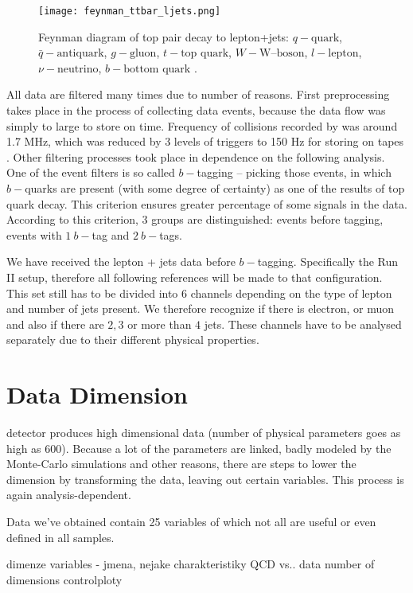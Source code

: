 \begin{figure}[htb]
    \centering
	\texttt{[image: feynman\_ttbar\_ljets.png]}
    \caption{Feynman diagram of top pair decay to lepton+jets: 
    $q - \text{quark}$,
    $\bar{q} - \text{antiquark}$,
	$g - \text{gluon}$,
	$t - \text{top quark}$,
    $W - \text{W--boson}$,
    $l - \text{lepton}$,
    $\nu - \text{neutrino}$,
    $b - \text{bottom quark}$ \cite{Heinson}.}
   	\label{fig:feynman-ljets}
\end{figure} 

All data are filtered many times due to number of reasons. First preprocessing takes  place in the process of collecting data events, because the data flow was simply to large to store on time. Frequency of collisions recorded by \dzero was around 1.7 MHz, which was reduced by 3 levels of triggers to 150 Hz for storing on tapes \cite{Yuntse}. Other filtering processes took place in dependence on the following analysis. One of the event filters is so called $b-$tagging -- picking those events, in which $b-$quarks are present (with some degree of certainty) as one of the results of top quark decay. This criterion ensures greater percentage of some signals in the data. According to this criterion, 3 groups are distinguished: events before tagging, events with $1\: b-$tag and $2\: b-$tags.

We have received the lepton + jets data before $b-$tagging. Specifically the Run II setup, therefore all following references will be made to that configuration. This set still has to be divided into 6 channels depending on the type of lepton and number of jets present. We therefore recognize if there is electron, or muon and also if there are $2, 3$ or more than $4$ jets. These channels have to be analysed separately due to their different physical properties.

\section{Data Dimension}
\dzero detector  produces high dimensional data (number of physical parameters  goes as high as $600$). Because a lot of the parameters are linked, badly modeled by the Monte-Carlo simulations and other reasons, there are steps to lower the dimension by transforming the data, leaving out certain variables. This process is again analysis-dependent.

Data we've obtained contain 25 variables of which not all are useful or even defined in all samples. 

dimenze
variables - jmena, nejake charakteristiky
QCD vs.. data
number of dimensions
controlploty


